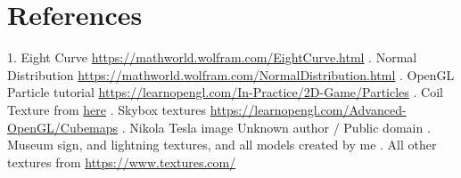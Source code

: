 \documentclass[10pt, oneside]{article}   	%
\begin{document}
\section{References}
1. Eight Curve \textcolor{blue}{\url{https://mathworld.wolfram.com/EightCurve.html}} 
. Normal Distribution \textcolor{blue}{\url{https://mathworld.wolfram.com/NormalDistribution.html}}
. OpenGL Particle tutorial \textcolor{blue}{\url{https://learnopengl.com/In-Practice/2D-Game/Particles}}
. Coil Texture from \textcolor{blue}{\href{http://polymericinsulators.m.sell.fnxradio.com/pz6904fc0-film-sintering-enamel-coated-copper-wire-for-motor-winding-high-power.html}{here}}
. Skybox textures  \textcolor{blue}{\url{https://learnopengl.com/Advanced-OpenGL/Cubemaps}}
. Nikola Tesla image Unknown author / Public domain
. Museum sign, and lightning textures, and all models created by me
. All other textures from \textcolor{blue}{\url{https://www.textures.com/}}  %
\end{document}

